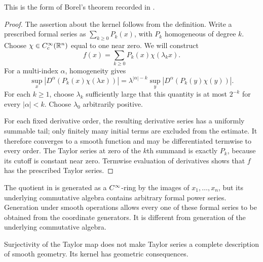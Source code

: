 
This is the form of Borel's theorem recorded in
\citet[Chapter~I, Theorem~1.3]{Moerdijk_Reyes_Smooth_Infinitesimal_Analysis}.

\begin{proof}
The assertion about the kernel follows from the definition.
Write a prescribed formal series as $\sum_{k\geq0}P_k(x)$, with $P_k$
homogeneous of degree $k$. Choose $\chi\in C^\infty_c(\mathbb{R}^n)$ equal to
one near zero. We will construct
\[
 f(x)=\sum_{k\geq0}P_k(x)\chi(\lambda_kx).
\]
For a multi-index $\alpha$, homogeneity gives
\[
 \sup_x\left|D^\alpha(P_k(x)\chi(\lambda x))\right|
 =\lambda^{|\alpha|-k}
   \sup_y|D^\alpha(P_k(y)\chi(y))|.
\]
For each $k\geq1$, choose $\lambda_k$ sufficiently large that this
quantity is at most $2^{-k}$ for every $|\alpha|<k$.
Choose $\lambda_0$ arbitrarily positive.

For each fixed derivative order, the resulting derivative series has
a uniformly summable tail; only finitely many initial terms are excluded
from the estimate. It therefore converges to a smooth function and may
be differentiated termwise to every order.
The Taylor series at zero of the $k$th summand is exactly $P_k$,
because its cutoff is constant near zero. Termwise evaluation of
derivatives shows that $f$ has the prescribed Taylor series.
\end{proof}

The quotient in  is generated as a $C^\infty$-ring by the
images of $x_1,\ldots,x_n$, but its underlying commutative algebra contains
arbitrary formal power series. Generation under smooth operations allows every one of these formal
series to be obtained from the coordinate generators. It is different
from generation of the underlying commutative algebra.

Surjectivity of the Taylor map does not make Taylor series a complete
description of smooth geometry. Its kernel has geometric consequences.

